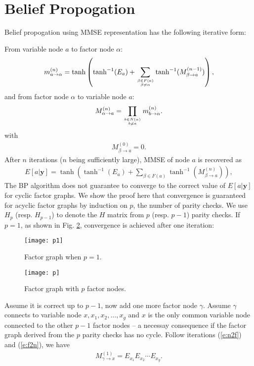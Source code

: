 \documentclass[12pt]{article}
\newcommand{\vect}[1]{\mathbf{#1}}
\begin{document}
\section{Belief Propogation}
Belief propogation using MMSE representation has the following iterative form:

From variable node $a$ to factor node $\alpha$:
\begin{align}
m_{a\rightarrow\alpha}^{(n)}=\tanh\left(\tanh^{-1}(E_a)+\sum_{\beta\in F(a)\atop \beta \neq \alpha}\tanh^{-1}(M_{\beta\rightarrow  a}^{(n-1)})\right), \label{e:n2f}
\end{align}
and from factor node $\alpha$ to variable node $a$:
\begin{align}
M_{\alpha\rightarrow a}^{(n)} = \prod_{b\in N(\alpha)\atop b \neq a}m_{b\rightarrow \alpha}^{(n)}. \label{e:f2n}
\end{align}
with
\begin{align}
M_{\beta\rightarrow a}^{(0)} = 0.
\end{align}
After $n$ iterations ($n$ being sufficiently large), MMSE of node $a$ is recovered as
\begin{align}
E[a|\vect{y}] = \tanh\left(\tanh^{-1}(E_a)+\sum_{\beta\in F(a)}\tanh^{-1}(M_{\beta\rightarrow  a}^{(n)})\right),
\end{align}
The BP algorithm does not guarantee to converge to the correct value of $E[a|\vect{y}]$ for cyclic factor graphs. We show the proof here that convergence is guaranteed for acyclic factor graphs by induction on $p$, the number of parity checks. We use $H_p$ (resp. $H_{p-1}$) to denote the $H$ matrix from $p$ (resp. $p-1$) parity checks. If $p=1$, as shown in Fig. \ref{f:p=1}, convergence is achieved after one iteration:
\begin{figure}[h]
\centering
\texttt{[image: p1]}
\caption{Factor graph when $p=1$.}
\label{f:p=1}
\end{figure}
\begin{figure}[h]
\centering
\texttt{[image: p]}
\caption{Factor graph with $p$ factor nodes.}
\label{f:p=1}
\end{figure}
Assume it is correct up to $p-1$, now add one more factor node $\gamma$. Assume $\gamma$ connects to variable node $x, x_1, x_2, \ldots, x_g$ and $x$ is the only common variable node connected to the other $p-1$ factor nodes -- a necessay consequence if the factor graph derived from the $p$ parity checks has no cycle. Follow iterations (\ref{e:n2f}) and (\ref{e:f2n}), we have
\begin{align*}
M_{\gamma\rightarrow x}^{(1)} = E_{x_1}E_{x_2}\cdots E_{x_g}.
\end{align*}
\end{document}
